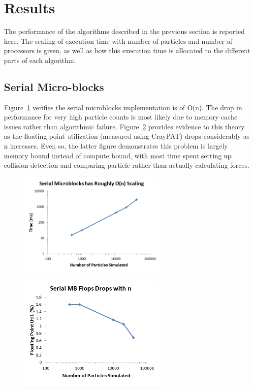 \documentclass[11pt]{article} %
\begin{document}


\section{Results}
\label{results-section}

The performance of the algorithms described in the previous section is reported here. The scaling of execution time with number of particles and number of processors is given, as well as how this execution time is allocated to the different parts of each algorithm.

\subsection{Serial Micro-blocks}

Figure~\ref{serial_mb_n} verifies the serial microblocks implementation is of O(n). The drop in performance for very high particle counts is most likely due to memory cache issues rather than algorithmic failure. Figure~\ref{serial_mb_flops} provides evidence to this theory as the floating point utilization (measured using CrayPAT) drops considerably as n increases. Even so, the latter figure demonstrates this problem is largely memory bound instead of compute bound, with most time spent setting up collision detection and comparing particle rather than actually calculating forces.

\begin{figure}[!h]
\centering
\includegraphics[width=0.65\textwidth]{figures/serial_mb_n.png}
\caption{}
\label{serial_mb_n}
\end{figure}

\begin{figure}[!h]
\centering
\includegraphics[width=0.65\textwidth]{figures/serial_mb_flops.png}
\caption{}
\label{serial_mb_flops}
\end{figure}
\end{document}
